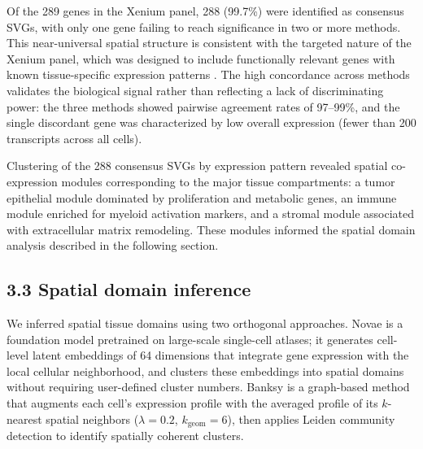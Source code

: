 \documentclass[12pt,a4paper]{article}
\begin{document}
Of the 289 genes in the Xenium panel, 288 (99.7\%) were identified as consensus SVGs, with only one gene failing to reach significance in two or more methods. This near-universal spatial structure is consistent with the targeted nature of the Xenium panel, which was designed to include functionally relevant genes with known tissue-specific expression patterns \citep{janesick2023high}. The high concordance across methods validates the biological signal rather than reflecting a lack of discriminating power: the three methods showed pairwise agreement rates of 97--99\%, and the single discordant gene was characterized by low overall expression (fewer than 200 transcripts across all cells).

Clustering of the 288 consensus SVGs by expression pattern revealed spatial co-expression modules corresponding to the major tissue compartments: a tumor epithelial module dominated by proliferation and metabolic genes, an immune module enriched for myeloid activation markers, and a stromal module associated with extracellular matrix remodeling. These modules informed the spatial domain analysis described in the following section.

\subsection*{3.3 Spatial domain inference}
We inferred spatial tissue domains using two orthogonal approaches. Novae \citep{schaar2025novae} is a foundation model pretrained on large-scale single-cell atlases; it generates cell-level latent embeddings of 64 dimensions that integrate gene expression with the local cellular neighborhood, and clusters these embeddings into spatial domains without requiring user-defined cluster numbers. Banksy \citep{zhao2023banksy} is a graph-based method that augments each cell's expression profile with the averaged profile of its $k$-nearest spatial neighbors ($\lambda = 0.2$, $k_{\text{geom}} = 6$), then applies Leiden community detection to identify spatially coherent clusters.
\end{document}
